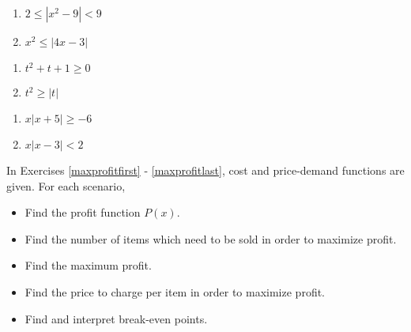 \documentclass{ximera}
\begin{document}
\begin{multicols}{2}
\begin{enumerate}
\setcounter{enumi}{\value{HW}}

\item $2 \leq |x^{2} - 9| < 9$
\item $x^{2} \leq |4x - 3|$

\setcounter{HW}{\value{enumi}}
\end{enumerate}
\end{multicols}


\begin{multicols}{2}
\begin{enumerate}
\setcounter{enumi}{\value{HW}}

\item $t^{2} + t + 1 \geq 0$
\item  $t^2 \geq |t|$ 

\setcounter{HW}{\value{enumi}}
\end{enumerate}
\end{multicols}

\begin{multicols}{2}
\begin{enumerate}
\setcounter{enumi}{\value{HW}}

\item  $x |x+5| \geq -6$  
\item  $x |x-3| < 2$   \label{solveineququadlasta}

\setcounter{HW}{\value{enumi}}
\end{enumerate}
\end{multicols}




In Exercises \ref{maxprofitfirst} - \ref{maxprofitlast}, cost and price-demand functions are given.  For each scenario,


\begin{itemize}

\item  Find the profit function $P(x)$.

\item  Find the number of items which need to be sold in order to maximize profit.

\item  Find the maximum profit.

\item  Find the price to charge per item in order to maximize profit.

\item  Find and interpret break-even points.

\end{itemize}
\end{document}
